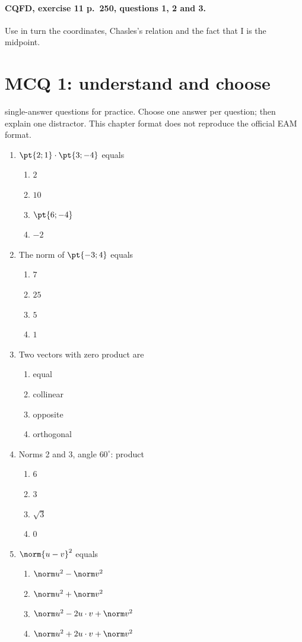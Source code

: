\paragraph{CQFD, exercise 11 p.~250, questions 1, 2 and 3.}\label{C03-M2} Use in turn the coordinates, Chasles's relation and the fact that I is the midpoint.
\begingroup\small
\mxnewpage\section*{MCQ 1: understand and choose}\label{C03-Q1}
 single-answer questions for practice. Choose one answer per question; then explain one distractor. This chapter format does not reproduce the official EAM format.
\begin{enumerate}
\item $\pt{2;1}\cdot\pt{3;-4}$ equals
\begin{enumerate}[label=\Alph*.,itemsep=2pt]
\item $2$
\item $10$
\item $\pt{6;-4}$
\item $-2$
\end{enumerate}
\item The norm of $\pt{-3;4}$ equals
\begin{enumerate}[label=\Alph*.,itemsep=2pt]
\item $7$
\item $25$
\item $5$
\item $1$
\end{enumerate}
\item Two vectors with zero product are
\begin{enumerate}[label=\Alph*.,itemsep=2pt]
\item equal
\item collinear
\item opposite
\item orthogonal
\end{enumerate}
\item Norms 2 and 3, angle $60^\circ$: product
\begin{enumerate}[label=\Alph*.,itemsep=2pt]
\item $6$
\item $3$
\item $\sqrt3$
\item $0$
\end{enumerate}
\item $\norm{u-v}^2$ equals
\begin{enumerate}[label=\Alph*.,itemsep=2pt]
\item $\norm u^2-\norm v^2$
\item $\norm u^2+\norm v^2$
\item $\norm u^2-2u\cdot v+\norm v^2$
\item $\norm u^2+2u\cdot v+\norm v^2$
\end{enumerate}
\end{enumerate}
